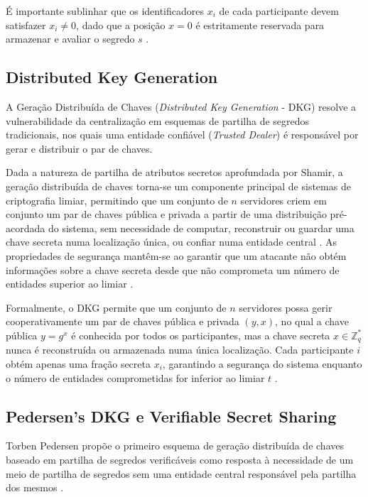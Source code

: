É importante sublinhar que os identificadores $x_i$ de cada participante devem satisfazer $x_i \neq 0$, dado que a posição $x=0$ é estritamente reservada para armazenar e avaliar o segredo $s$ \cite{bogdanov_shamir_notes}.

\subsection{Distributed Key Generation}

A Geração Distribuída de Chaves (\textit{Distributed Key Generation} - DKG) resolve a vulnerabilidade da centralização em esquemas de partilha de segredos tradicionais, nos quais uma entidade confiável (\textit{Trusted Dealer}) é responsável por gerar e distribuir o par de chaves.

Dada a natureza de partilha de atributos secretos aprofundada por Shamir, a geração distribuída de chaves torna-se um componente principal de sistemas de criptografia limiar, permitindo que um conjunto de $n$ servidores criem em conjunto um par de chaves pública e privada a partir de uma distribuição pré-acordada do sistema, sem necessidade de computar, reconstruir ou guardar uma chave secreta numa localização única, ou confiar numa entidade central \cite{gennaro2007secure}. As propriedades de segurança mantêm-se ao garantir que um atacante não obtém informações sobre a chave secreta desde que não comprometa um número de entidades superior ao limiar \cite{gennaro2007secure}.

Formalmente, o DKG permite que um conjunto de $n$ servidores possa gerir cooperativamente um par de chaves pública e privada $(y,x)$, no qual a chave pública $y = g^x$ é conhecida por todos os participantes, mas a chave secreta $x \in \mathbb{Z}_q^*$ nunca é reconstruída ou armazenada numa única localização. Cada participante $i$ obtém apenas uma fração secreta $x_i$, garantindo a segurança do sistema enquanto o número de entidades comprometidas for inferior ao limiar $t$ \cite{gennaro2007secure}.

\subsection{Pedersen's DKG e Verifiable Secret Sharing}
\label{sub:pedersen_dkg}

Torben Pedersen propõe o primeiro esquema de geração distribuída de chaves baseado em partilha de segredos verificáveis \cite{gennaro2007secure} como resposta à necessidade de um meio de partilha de segredos sem uma entidade central responsável pela partilha dos mesmos \cite{pedersen1991threshold}.

